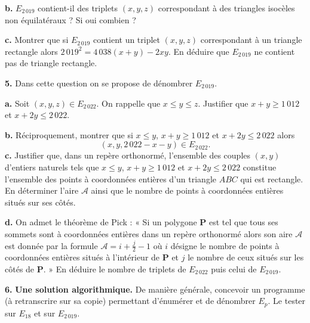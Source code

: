 \textbf{b.} $E_{2\,019}$ contient-il des triplets $(x, y, z)$ correspondant à des triangles isocèles non équilatéraux ? Si oui
combien ?

\textbf{c.} Montrer que si $E_{2\,019}$ contient un triplet $(x, y, z)$ correspondant à un triangle rectangle alors
$2\,019^2 = 4\,038(x + y) - 2xy$.
En déduire que $E_{2\,019}$ ne contient pas de triangle rectangle.

\textbf{5.} Dans cette question on se propose de dénombrer $E_{2\,019}$.

\textbf{a.} Soit $(x, y, z) \in E_{2\,022}$. On rappelle que $x \leqslant y \leqslant z$. Justifier que $x + y \geqslant 1\,012$ et $x + 2y \leqslant 2\,022$.

\textbf{b.} Réciproquement, montrer que si $x \leqslant y$, $x + y \geqslant 1\,012$ et $x + 2y \leqslant 2\,022$ alors
\[
(x, y, 2\,022 - x - y) \in E_{2\,022}.
\]
\textbf{c.} Justifier que, dans un repère orthonormé, l'ensemble des couples $(x, y)$ d'entiers naturels tels que $x \leqslant y$,
$x + y \geqslant 1\,012$ et $x + 2y \leqslant 2\,022$ constitue l'ensemble des points à coordonnées entières d'un triangle $ABC$ qui
est rectangle. En déterminer l'aire $\mathcal{A}$ ainsi que le nombre de points à coordonnées entières situés sur ses côtés.

\textbf{d.} On admet le théorème de Pick : « Si un polygone $\boldsymbol{P}$ est tel que tous ses sommets sont à coordonnées entières
dans un repère orthonormé alors son aire $\mathcal{A}$ est donnée par la formule $\mathcal{A} = i + \frac{j}{2} - 1$ où $i$ désigne le nombre de
points à coordonnées entières situés à l'intérieur de $\boldsymbol{P}$ et $j$ le nombre de ceux situés sur les côtés de $\boldsymbol{P}$. »
En déduire le nombre de triplets de $E_{2\,022}$ puis celui de $E_{2\,019}$.

\textbf{6.} \textbf{Une solution algorithmique.}
De manière générale, concevoir un programme (à retranscrire sur sa copie) permettant d'énumérer et de
dénombrer $E_p$. Le tester sur $E_{18}$ et sur $E_{2\,019}$.
